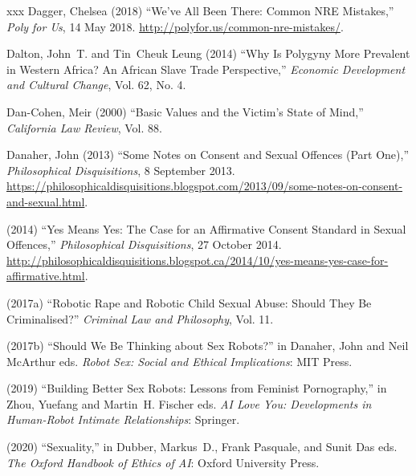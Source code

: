 \documentclass[]{jlreq} \usepackage{mystyle}
\begin{document}
\begin{thebibliography}{xxx}
Dagger, Chelsea (2018) ``We've All Been There: Common NRE Mistakes,''
  \emph{Poly for Us}, 14 May 2018.
  \url{http://polyfor.us/common-nre-mistakes/}.

Dalton, John~T. and Tin~Cheuk Leung (2014) ``Why Is Polygyny More Prevalent in
  Western Africa? An African Slave Trade Perspective,'' \textit{ Economic
  Development and Cultural Change}, Vol. 62, No. 4.

Dan-Cohen, Meir (2000) ``Basic Values and the Victim's State of Mind,''
  \textit{ California Law Review}, Vol. 88.

Danaher, John (2013) ``Some Notes on Consent and Sexual Offences (Part One),''
  \emph{Philosophical Disquisitions}, 8 September 2013.
  \url{https://philosophicaldisquisitions.blogspot.com/2013/09/some-notes-on-consent-and-sexual.html}.

 \bysame{}  (2014) ``Yes Means Yes: The Case for an Affirmative Consent
  Standard in Sexual Offences,'' \emph{Philosophical Disquisitions}, 27 October
  2014.
  \url{http://philosophicaldisquisitions.blogspot.ca/2014/10/yes-means-yes-case-for-affirmative.html}.

 \bysame{}  (2017a) ``Robotic Rape and Robotic Child Sexual Abuse: Should They
  Be Criminalised?'' \textit{ Criminal Law and Philosophy}, Vol. 11.

 \bysame{}  (2017b) ``Should We Be Thinking about Sex Robots?'' in Danaher,
  John and Neil McArthur eds.   \textit{ Robot Sex: Social and Ethical
  Implications}: MIT Press.

 \bysame{}  (2019) ``Building Better Sex Robots: Lessons from Feminist
  Pornography,'' in Zhou, Yuefang and Martin~H. Fischer eds.   \textit{ AI Love
  You: Developments in Human-Robot Intimate Relationships}: Springer.

 \bysame{}  (2020) ``Sexuality,'' in Dubber, Markus~D., Frank Pasquale, and
  Sunit Das eds.   \textit{ The Oxford Handbook of Ethics of AI}: Oxford
  University Press.


\end{thebibliography}
\end{document}
